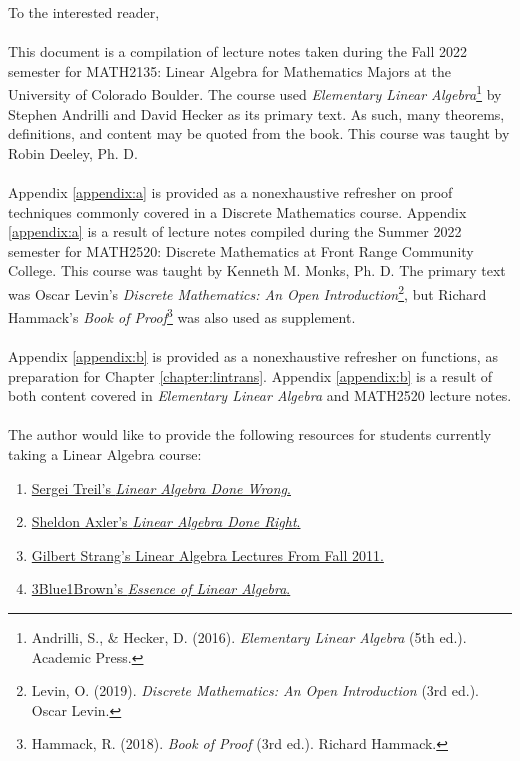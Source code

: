 To the interested reader,
\\
\\
This document is a compilation of lecture notes taken during the Fall 2022 semester for MATH2135: Linear Algebra for Mathematics Majors at the University of Colorado Boulder. The course used \textit{Elementary Linear Algebra}\footnote{Andrilli, S., \& Hecker, D. (2016). \textit{Elementary Linear Algebra} (5th ed.). Academic Press.} by Stephen Andrilli and David Hecker as its primary text. As such, many theorems, definitions, and content may be quoted from the book. This course was taught by Robin Deeley, Ph. D.
\\
\\
Appendix \ref{appendix:a} is provided as a nonexhaustive refresher on proof techniques commonly covered in a Discrete Mathematics course. Appendix \ref{appendix:a} is a result of lecture notes compiled during the Summer 2022 semester for MATH2520: Discrete Mathematics at Front Range Community College. This course was taught by Kenneth M. Monks, Ph. D. The primary text was Oscar Levin's \textit{Discrete Mathematics: An Open Introduction}\footnote{Levin, O. (2019). \textit{Discrete Mathematics: An Open Introduction} (3rd ed.). Oscar Levin.}, but Richard Hammack's \textit{Book of Proof}\footnote{Hammack, R. (2018). \textit{Book of Proof} (3rd ed.). Richard Hammack.} was also used as supplement.
\\
\\
Appendix \ref{appendix:b} is provided as a nonexhaustive refresher on functions, as preparation for Chapter \ref{chapter:lintrans}. Appendix \ref{appendix:b} is a result of both content covered in \textit{Elementary Linear Algebra} and MATH2520 lecture notes.
\\
\\
The author would like to provide the following resources for students currently taking a Linear Algebra course:
\begin{enumerate}
    \item \href{https://www.math.brown.edu/streil/papers/LADW/LADW_2017-09-04.pdf}{Sergei Treil's \textit{Linear Algebra Done Wrong}.}
    \item \href{https://link.springer.com/book/10.1007/978-3-319-11080-6?utm_medium=affiliate&utm_source=commission_junction_authors&utm_campaign=CONR_BOOKS_ECOM_GL_PHSS_ALWYS_DEEPLINK&utm_content=deeplink&utm_term=PID100197440&CJEVENT=f9f74b076a4c11ed80fe023d0a1c0e0d}{Sheldon Axler's \textit{Linear Algebra Done Right}.}
    \item \href{https://youtube.com/playlist?list=PL221E2BBF13BECF6C}{Gilbert Strang's Linear Algebra Lectures From Fall 2011.}
    \item \href{https://www.youtube.com/playlist?app=desktop&list=PLZHQObOWTQDPD3MizzM2xVFitgF8hE_ab}{3Blue1Brown's \textit{Essence of Linear Algebra}.}
\end{enumerate}
